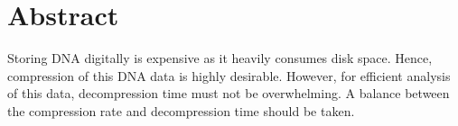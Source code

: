 \chapter*{Abstract}

Storing DNA digitally is expensive as it heavily consumes disk space. Hence,
compression of this DNA data is highly desirable. However, for efficient
analysis of this data, decompression time must not be overwhelming. A balance
between the compression rate and decompression time should be taken.

